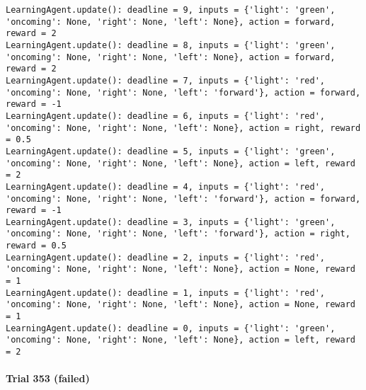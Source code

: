 \documentclass{article}
\begin{document}
\begin{verbatim}
LearningAgent.update(): deadline = 9, inputs = {'light': 'green', 'oncoming': None, 'right': None, 'left': None}, action = forward, reward = 2
LearningAgent.update(): deadline = 8, inputs = {'light': 'green', 'oncoming': None, 'right': None, 'left': None}, action = forward, reward = 2
LearningAgent.update(): deadline = 7, inputs = {'light': 'red', 'oncoming': None, 'right': None, 'left': 'forward'}, action = forward, reward = -1
LearningAgent.update(): deadline = 6, inputs = {'light': 'red', 'oncoming': None, 'right': None, 'left': None}, action = right, reward = 0.5
LearningAgent.update(): deadline = 5, inputs = {'light': 'green', 'oncoming': None, 'right': None, 'left': None}, action = left, reward = 2
LearningAgent.update(): deadline = 4, inputs = {'light': 'red', 'oncoming': None, 'right': None, 'left': 'forward'}, action = forward, reward = -1
LearningAgent.update(): deadline = 3, inputs = {'light': 'green', 'oncoming': None, 'right': None, 'left': 'forward'}, action = right, reward = 0.5
LearningAgent.update(): deadline = 2, inputs = {'light': 'red', 'oncoming': None, 'right': None, 'left': None}, action = None, reward = 1
LearningAgent.update(): deadline = 1, inputs = {'light': 'red', 'oncoming': None, 'right': None, 'left': None}, action = None, reward = 1
LearningAgent.update(): deadline = 0, inputs = {'light': 'green', 'oncoming': None, 'right': None, 'left': None}, action = left, reward = 2
\end{verbatim}

\paragraph{Trial 353 (failed)}\label{trial-353-failed}
\end{document}
